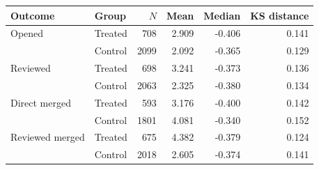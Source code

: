 \small
\begin{tabular}{llrrrr}
\toprule
Outcome & Group & $N$ & Mean & Median & KS distance \\
\midrule
Opened & Treated & 708 & 2.909 & -0.406 & 0.141 \\
       & Control & 2099 & 2.092 & -0.365 & 0.129 \\
Reviewed & Treated & 698 & 3.241 & -0.373 & 0.136 \\
         & Control & 2063 & 2.325 & -0.380 & 0.134 \\
Direct merged & Treated & 593 & 3.176 & -0.400 & 0.142 \\
              & Control & 1801 & 4.081 & -0.340 & 0.152 \\
Reviewed merged & Treated & 675 & 4.382 & -0.379 & 0.124 \\
                & Control & 2018 & 2.605 & -0.374 & 0.141 \\
\bottomrule
\end{tabular}
